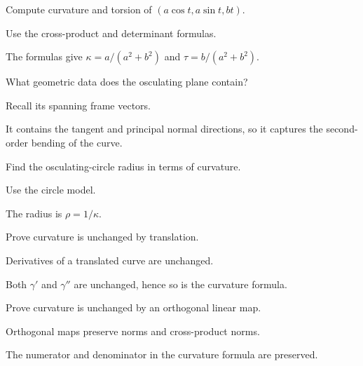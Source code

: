 \begin{exercise}\label{exr:vii13-13}
Compute curvature and torsion of \((a\cos t,a\sin t,bt)\).
\end{exercise}
\begin{hint}
Use the cross-product and determinant formulas.
\end{hint}
\begin{solution}
The formulas give \(\kappa=a/(a^2+b^2)\) and \(\tau=b/(a^2+b^2)\).
\end{solution}

\begin{exercise}\label{exr:vii13-14}
What geometric data does the osculating plane contain?
\end{exercise}
\begin{hint}
Recall its spanning frame vectors.
\end{hint}
\begin{solution}
It contains the tangent and principal normal directions, so it captures the second-order bending of the curve.
\end{solution}

\begin{exercise}\label{exr:vii13-15}
Find the osculating-circle radius in terms of curvature.
\end{exercise}
\begin{hint}
Use the circle model.
\end{hint}
\begin{solution}
The radius is \(\rho=1/\kappa\).
\end{solution}

\begin{exercise}\label{exr:vii13-16}
Prove curvature is unchanged by translation.
\end{exercise}
\begin{hint}
Derivatives of a translated curve are unchanged.
\end{hint}
\begin{solution}
Both \(\gamma'\) and \(\gamma''\) are unchanged, hence so is the curvature formula.
\end{solution}

\begin{exercise}\label{exr:vii13-17}
Prove curvature is unchanged by an orthogonal linear map.
\end{exercise}
\begin{hint}
Orthogonal maps preserve norms and cross-product norms.
\end{hint}
\begin{solution}
The numerator and denominator in the curvature formula are preserved.
\end{solution}


